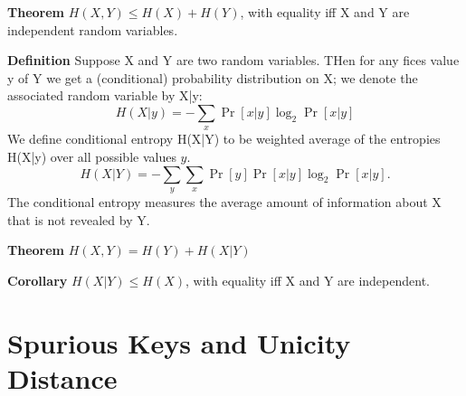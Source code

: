 \documentclass[a4paper,10pt]{article}
\begin{document}
\noindent
\textbf{Theorem} $H(X,Y) \leq H(X) + H(Y)$, with equality iff X and Y are independent random variables.

\noindent
\textbf{Definition} Suppose X and Y are two random variables. THen for any fices value y of Y we get a (conditional) probability distribution on X; we denote the associated random variable by X|y:
$$
H(X|y) = -\sum_x \Pr[x|y]\log_2 \Pr[x|y]
$$
We define conditional entropy H(X|Y) to be weighted average of the entropies H(X|y) over all possible values $y$.
$$
H(X|Y) = -\sum_y\sum_x\Pr[y]\Pr[x|y]\log_2\Pr[x|y].
$$
The conditional entropy measures the average amount of information about X that is not revealed by Y.

\noindent
\textbf{Theorem} $H(X,Y) = H(Y) + H(X|Y)$

\noindent
\textbf{Corollary} $H(X|Y) \leq H(X)$, with equality iff X and Y are independent.


\section*{Spurious Keys and Unicity Distance}
\end{document}
